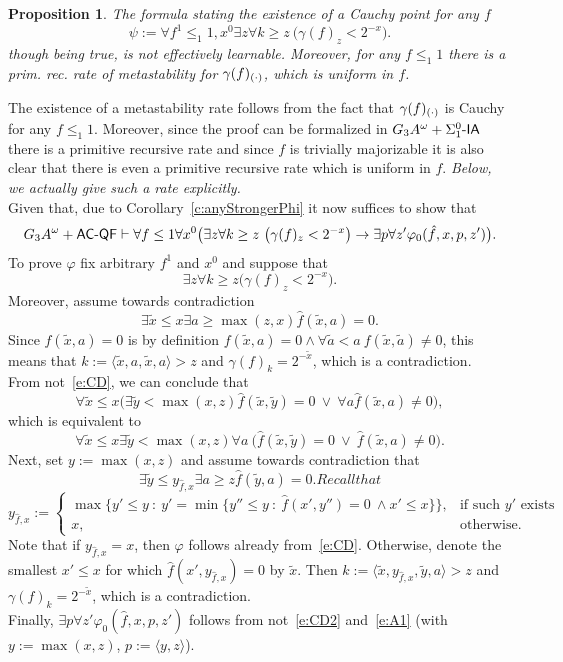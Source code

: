 \documentclass[1p]{elsarticle}
\newcommand{\usftext}[1]{\textsf{\upshape #1}}
\newcommand{\todo}[1]{{\it #1}
  \marginpar{\center\texttt{ToDo}}}    %
\newcommand{\be}[1][{e:\arabic{equation}}] { \begin{equation}\label{#1} }
\newcommand{\ee} { \end{equation} }
\newcommand{\IA}{\ensuremath{\usftext{IA}}} %
\newcommand{\QF}{\ensuremath{\usftext{QF}}}
\newcommand{\AC}{\ensuremath{\usftext{AC}}}
\newcommand{\SiLm}{\ensuremath{\Sigma^0_1\usftext{-}}}
\newcommand{\m}{\ensuremath{\usftext{-}}}
\newcommand{\Telse}{\text{otherwise}}
\theoremstyle{plain}
\newtheorem{prop}[thm]{Proposition}
\theoremstyle{definition}
\theoremstyle{remark}
\renewenvironment{proof}[1][]{\noindent{\bf Proof{#1}. }}{\nopagebreak[4]{\hspace*{\fill}
  $\Box$              %
 }{\vspace{2ex}}}
\renewcommand{\phi}{\varphi}
\theoremstyle{definition}
\begin{document}
{\begin{prop}\label{p:gammaf}
The formula stating the existence of a Cauchy point for any $f$ 
\[
\psi:=\forall f^1\leq_1 1,x^0\exists z \forall k\geq z\ \big( \gamma(f)_z<2^{-x} \big).
\]
though being true, is not effectively learnable. Moreover, for any $f\leq_1 1$ there is
a prim. rec. rate of metastability for $\gamma(f)_{(\cdot)}$, which is uniform in $f$.
\end{prop}
\begin{proof}
The existence of a metastability rate follows from the fact
that $\gamma(f)_{(\cdot)}$ is Cauchy for any $f\leq_1 1$. Moreover, since the
proof can be formalized in $G_3A^\omega+\SiLm\IA$ there is a primitive recursive rate and since $f$ is trivially majorizable it is also
clear that there is even a primitive recursive rate which is uniform in $f$. \todo{Below, we actually give such a rate explicitly.}\\
Given that, due to Corollary~\ref{c:anyStrongerPhi} it now suffices to show that
\[ G_3A^\omega+\AC\m\QF\vdash 
\forall f\leq 1 \forall x^0\big( \exists z \forall k\geq z\ \big( \gamma(f)_z<2^{-x} \big)
 \rightarrow \exists p\forall z' \phi_0(\hat f,x,p,z') \big).
 \]
To prove $\phi$ fix arbitrary $f^1$ and $x^0$ and suppose that
\[\exists z\forall k\geq z \big( \gamma(f)_z<2^{-x} \big).\]
Moreover, assume towards contradiction
\be[e:CD]
\exists \tilde x\leq x \exists a\geq\max(z,x) \hat f(\tilde x,a)=0. 
\ee
Since $\hat f(\tilde x,a)=0$ is by definition $f(\tilde x,a)=0 \wedge \forall \tilde a < a\ f(\tilde x,\tilde a)\neq 0$, 
this means that $k:=\langle \tilde x, a, \tilde x, a\rangle > z$ and $\gamma(f)_k=2^{-\tilde x}$, which is a contradiction.\\
From not~\eqref{e:CD}, we can conclude that
\[
\forall \tilde x\leq x\big( \exists\tilde y<\max(x,z) \hat f(\tilde x,\tilde y)=0\ \vee\ \forall a \hat f(\tilde x,a)\neq 0\big),
\] 
which is equivalent to
\be[e:A1]
\forall \tilde x\leq x \exists\tilde y<\max(x,z) \forall a\ \big(  \hat f(\tilde x,\tilde y)=0\ \vee\  \hat f(\tilde x,a)\neq 0\big).
\ee 
Next, set $y:=\max(x,z)$ and assume towards contradiction that
\be[e:CD2]
 \exists \tilde y\leq y_{\hat f, x} \exists a\geq z \hat f(\tilde y,a)=0. 
Recall that 
\ee
\[
y_{\hat f, x}:=\begin{cases}
\max\big\{y'\leq y\ :\ y'=\min\{y''\leq y\ :\ \hat f(x',y'')=0\ \wedge x'\leq x \}\big\},&\text{if such $y'$ exists}\\
x,&\Telse.
\end{cases}
\]
Note that if $y_{\hat f, x}=x$, then $\phi$ follows already from~\eqref{e:CD}. Otherwise, denote the smallest $x'\leq x$ for which
$\hat f (x',y_{\hat f, x})=0$ by $\tilde x$. Then $k:=\langle \tilde x, y_{\hat f, x}, \tilde y, a\rangle > z$ and $\gamma(f)_k=2^{-\tilde x}$, which is a contradiction.\\
Finally, $\exists p\forall z' \phi_0(\hat f,x,p,z')$ follows from not~\eqref{e:CD2} and~\eqref{e:A1} (with $y:=\max(x,z)$, $p:=\langle y, z\rangle$).
\\
\end{proof}

}
\end{document}
